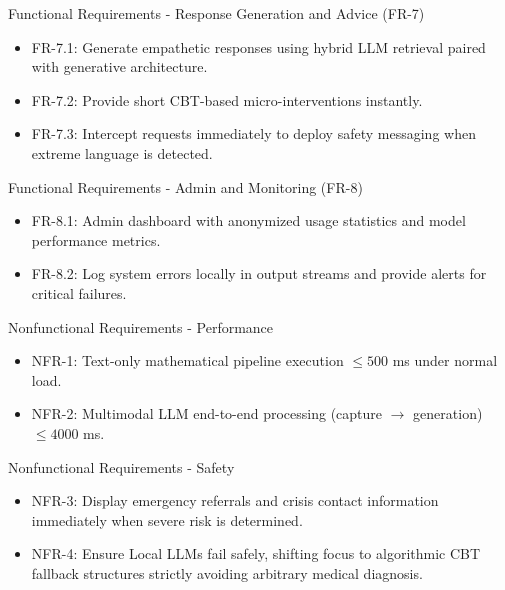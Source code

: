 \documentclass{beamer}
\begin{document}
\begin{frame}{Functional Requirements - Response Generation and Advice (FR-7)}
\begin{itemize}
    \item FR-7.1: Generate empathetic responses using hybrid LLM retrieval paired with generative architecture.
    \item FR-7.2: Provide short CBT-based micro-interventions instantly.
    \item FR-7.3: Intercept requests immediately to deploy safety messaging when extreme language is detected.
\end{itemize}
\end{frame}

\begin{frame}{Functional Requirements - Admin and Monitoring (FR-8)}
\begin{itemize}
    \item FR-8.1: Admin dashboard with anonymized usage statistics and model performance metrics.
    \item FR-8.2: Log system errors locally in output streams and provide alerts for critical failures.
\end{itemize}
\end{frame}


\begin{frame}{Nonfunctional Requirements - Performance}
\begin{itemize}
    \item NFR-1: Text-only mathematical pipeline execution $\leq 500$ ms under normal load.
    \item NFR-2: Multimodal LLM end-to-end processing (capture $\to$ generation) $\leq 4000$ ms.
\end{itemize}
\end{frame}

\begin{frame}{Nonfunctional Requirements - Safety}
\begin{itemize}
    \item NFR-3: Display emergency referrals and crisis contact information immediately when severe risk is determined.
    \item NFR-4: Ensure Local LLMs fail safely, shifting focus to algorithmic CBT fallback structures strictly avoiding arbitrary medical diagnosis.
\end{itemize}
\end{frame}
\end{document}
